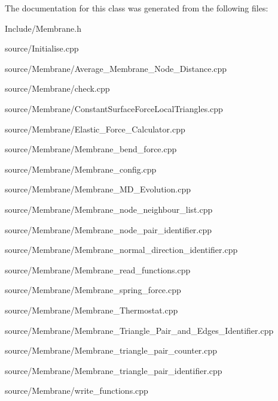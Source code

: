 The documentation for this class was generated from the following files\+:\begin{DoxyCompactItemize}
\item 
Include/Membrane.\+h\item 
source/Initialise.\+cpp\item 
source/\+Membrane/Average\+\_\+\+Membrane\+\_\+\+Node\+\_\+\+Distance.\+cpp\item 
source/\+Membrane/check.\+cpp\item 
source/\+Membrane/Constant\+Surface\+Force\+Local\+Triangles.\+cpp\item 
source/\+Membrane/Elastic\+\_\+\+Force\+\_\+\+Calculator.\+cpp\item 
source/\+Membrane/Membrane\+\_\+bend\+\_\+force.\+cpp\item 
source/\+Membrane/Membrane\+\_\+config.\+cpp\item 
source/\+Membrane/Membrane\+\_\+\+M\+D\+\_\+\+Evolution.\+cpp\item 
source/\+Membrane/Membrane\+\_\+node\+\_\+neighbour\+\_\+list.\+cpp\item 
source/\+Membrane/Membrane\+\_\+node\+\_\+pair\+\_\+identifier.\+cpp\item 
source/\+Membrane/Membrane\+\_\+normal\+\_\+direction\+\_\+identifier.\+cpp\item 
source/\+Membrane/Membrane\+\_\+read\+\_\+functions.\+cpp\item 
source/\+Membrane/Membrane\+\_\+spring\+\_\+force.\+cpp\item 
source/\+Membrane/Membrane\+\_\+\+Thermostat.\+cpp\item 
source/\+Membrane/Membrane\+\_\+\+Triangle\+\_\+\+Pair\+\_\+and\+\_\+\+Edges\+\_\+\+Identifier.\+cpp\item 
source/\+Membrane/Membrane\+\_\+triangle\+\_\+pair\+\_\+counter.\+cpp\item 
source/\+Membrane/Membrane\+\_\+triangle\+\_\+pair\+\_\+identifier.\+cpp\item 
source/\+Membrane/write\+\_\+functions.\+cpp\end{DoxyCompactItemize}
